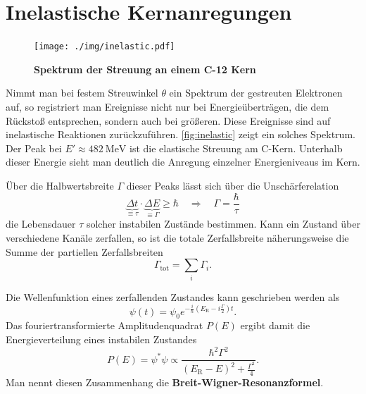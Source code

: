 \section{Inelastische Kernanregungen}
\begin{figure}
	\centering
	\texttt{[image: ./img/inelastic.pdf]}
	\caption{\textbf{Spektrum der Streuung an einem C-12 Kern}}
	\label{fig:inelastic}
\end{figure}
Nimmt man bei festem Streuwinkel $\theta$ ein Spektrum der gestreuten Elektronen auf, so registriert man Ereignisse nicht nur bei Energieüberträgen, die dem Rückstoß entsprechen,
sondern auch bei größeren.
Diese Ereignisse sind auf inelastische Reaktionen zurückzuführen.
\autoref{fig:inelastic} zeigt ein solches Spektrum.
Der Peak bei $E'\approx\SI{482}{\MeV}$ ist die elastische Streuung am C-Kern.
Unterhalb dieser Energie sieht man deutlich die Anregung einzelner Energieniveaus im Kern.

Über die Halbwertsbreite $\Gamma$ dieser Peaks lässt sich über die Unschärferelation
\begin{equation*}
	\underbrace{\Delta t}_{\equiv\tau}\cdot\underbrace{\Delta E}_{\equiv\Gamma} \geq \hbar\quad \Rightarrow\quad \Gamma = \frac{\hbar}{\tau}
\end{equation*}
die Lebensdauer $\tau$ solcher instabilen Zustände bestimmen.
Kann ein Zustand über verschiedene Kanäle zerfallen, so ist die totale Zerfallsbreite näherungsweise die Summe der partiellen Zerfallsbreiten
\begin{equation*}
	\Gamma_\text{tot} = \sum_i \Gamma_i.
\end{equation*}

Die Wellenfunktion eines zerfallenden Zustandes kann geschrieben werden als
\begin{equation*}
	\psi(t) = \psi_0e^{-\frac{i}{\hbar}\left(E_\text{R}-i\frac{\Gamma}{2}\right)t}.
\end{equation*}
Das fouriertransformierte Amplitudenquadrat $P(E)$ ergibt damit die Energieverteilung eines instabilen Zustandes
\begin{equation*}
	P(E) = \psi^*\psi\propto \frac{\hbar^2\Gamma^2}{(E_\text{R}-E)^2+\frac{\Gamma^2}{4}}.
\end{equation*}
Man nennt diesen Zusammenhang die \textbf{Breit-Wigner-Resonanzformel}.

